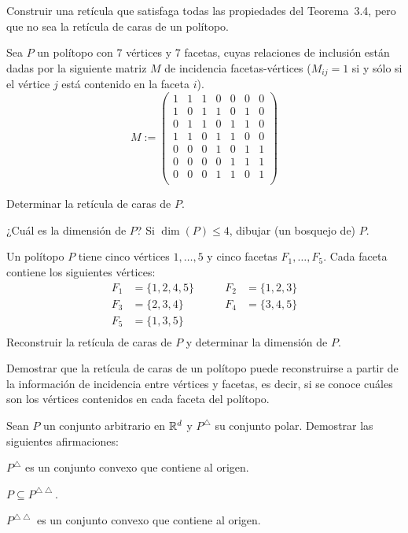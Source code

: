 \documentclass[a4paper,12pt]{article}
\newcommand{\Ppolar}[1]{#1^{\bigtriangleup}}
\newcommand{\Pdoblepolar}[1]{#1^{\bigtriangleup \bigtriangleup}}
\begin{document}
\begin{exerciselist}
\item Construir una retícula que satisfaga todas las propiedades del Teorema~3.4, pero que no sea la retícula de caras de un polítopo.

\item Sea $P$ un polítopo con 7 vértices y 7 facetas, cuyas relaciones de inclusión
están dadas por la siguiente matriz $M$ de incidencia facetas-vértices ($M_{ij}=1$
si y sólo si el vértice $j$ está contenido en la faceta $i$).
$$
M:= \left(
\begin{array}{ccccccc}
1 & 1 & 1 & 0 & 0 & 0 & 0 \\
1 & 0 & 1 & 1 & 0 & 1 & 0 \\
0 & 1 & 1 & 0 & 1 & 1 & 0 \\
1 & 1 & 0 & 1 & 1 & 0 & 0 \\
0 & 0 & 0 & 1 & 0 & 1 & 1 \\
0 & 0 & 0 & 0 & 1 & 1 & 1 \\
0 & 0 & 0 & 1 & 1 & 0 & 1 \\
\end{array}
\right)
$$
\begin{exerciselist}
\item Determinar la retícula de caras de $P$.
\item ¿Cuál es la dimensión de $P$? Si $\dim(P) \leq 4$, dibujar (un bosquejo
de) $P$.
\end{exerciselist}

\item Un polítopo $P$ tiene cinco vértices $1, \ldots, 5$ y cinco facetas $F_1, \ldots, F_5$. Cada faceta contiene los siguientes vértices:
\begin{align*}
F_1 &= \{1, 2, 4, 5\} \qquad &F_2 &= \{1, 2, 3\} \\
F_3 &= \{2, 3, 4\}  \qquad & F_4 &= \{3, 4, 5\} \\
F_5 &= \{1, 3, 5\} \\
\end{align*}
Reconstruir la retícula de caras de $P$ y determinar la dimensión de $P$.

\item Demostrar que la retícula de caras de un polítopo puede reconstruirse a partir de la información de incidencia entre vértices y facetas, es decir, si se conoce cuáles son los vértices contenidos en cada faceta del polítopo.

\item Sean $P$ un conjunto arbitrario en $\mathbb{R}^d$ y $\Ppolar{P}$ su conjunto polar.
Demostrar las siguientes afirmaciones:
\begin{exerciselist}
  \item $\Ppolar{P}$ es un conjunto convexo que contiene al origen.
  \item $P \subseteq \Pdoblepolar{P}$.
  \item $\Pdoblepolar{P}$ es un conjunto convexo que contiene al origen.
\end{exerciselist}


\end{exerciselist}
\end{document}
